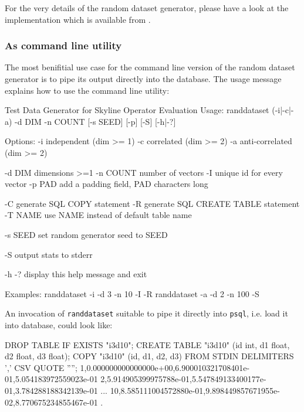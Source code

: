 For the very details of the random dataset generator, please have a
look at the implementation which is available from \citep{Eder2007a}.

\subsubsection{As command line utility}

The most benifitial use case for the command line version of the
random dataset generator is to pipe its output directly into the
database. The usage message explains how to use the command line
utility:

\begin{interactive}
Test Data Generator for Skyline Operator Evaluation
Usage: randdataset (-i|-c|-a) -d DIM -n COUNT [-s SEED] [-p] [-S] [-h|-?]

Options:
       -i       independent (dim >= 1)
       -c       correlated (dim >= 2)
       -a       anti-correlated (dim >= 2)

       -d DIM   dimensions >=1
       -n COUNT number of vectors
       -I       unique id for every vector
       -p PAD   add a padding field, PAD characters long

       -C       generate SQL COPY statement
       -R       generate SQL CREATE TABLE statement
       -T NAME  use NAME instead of default table name

       -s SEED  set random generator seed to SEED

       -S       output stats to stderr

       -h -?    display this help message and exit

Examples:
       randdataset -i -d 3 -n 10 -I -R
       randdataset -a -d 2 -n 100 -S
\end{interactive}

An invocation of \texttt{randdataset} suitable to pipe it directly
into \texttt{psql}, i.e. load it into database, could look like:

\begin{interactive}
DROP TABLE IF EXISTS "i3d10";
CREATE TABLE "i3d10" (id int, d1 float, d2 float, d3 float);
COPY "i3d10" (id, d1, d2, d3) FROM STDIN DELIMITERS ',' CSV QUOTE '''';
1,0.000000000000000e+00,6.900010321708401e-01,5.054183972559023e-01
2,5.914905399975788e-01,5.547849133400177e-01,3.784288188342139e-01
...
10,8.585111004572880e-01,9.898449857671955e-02,8.770675234855467e-01
\ttbackslash.
\end{interactive}

